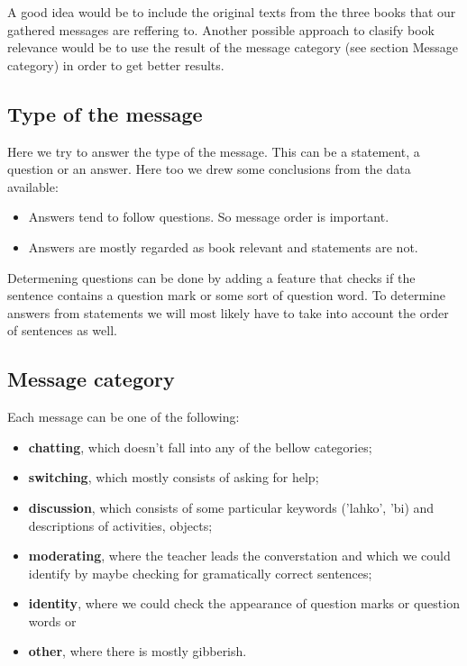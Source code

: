 \documentclass[11pt,a4paper]{article}
\begin{document}
A good idea would be to include the original texts from the three books that our gathered messages are reffering to.
Another possible approach to clasify book relevance would be to use the result of the message category (see section Message category) in order to get better results.

\subsection{Type of the message}
Here we try to answer the type of the message. 
This can be a statement, a question or an answer.
Here too we drew some conclusions from the data available:

\begin{itemize}
\item{Answers tend to follow questions. So message order is important.}
\item{Answers are mostly regarded as book relevant and statements are not.}
\end{itemize}

Determening questions can be done by adding a feature that checks if the sentence contains a question mark or some sort of question word.
To determine answers from statements we will most likely have to take into account the order of sentences as well.

\subsection{Message category}

Each message can be one of the following:
\begin{itemize}
\item{\textbf{chatting}, which doesn't fall into any of the bellow categories;}
\item{\textbf{switching}, which mostly consists of asking for help;}
\item{\textbf{discussion}, which consists of some particular keywords ('lahko', 'bi) and descriptions of activities, objects;}
\item{\textbf{moderating}, where the teacher leads the converstation and which we could identify by maybe checking for gramatically correct sentences;}
\item{\textbf{identity}, where we could check the appearance of question marks or question words or}
\item{\textbf{other}, where there is mostly gibberish.}
\end{itemize}
\end{document}
